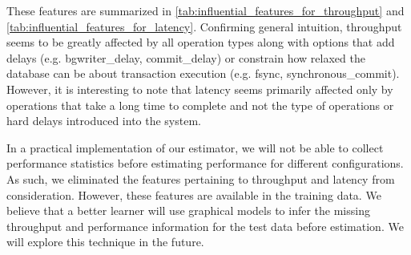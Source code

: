  These features are summarized in
\cref{tab:influential_features_for_throughput} and
\cref{tab:influential_features_for_latency}. Confirming general
intuition, throughput seems to be greatly affected by all operation
types along with options that add delays (e.g. bgwriter\_delay,
commit\_delay) or constrain how relaxed the database can be about
transaction execution (e.g. fsync, synchronous\_commit). However, it
is interesting to note that latency seems primarily affected only by
operations that take a long time to complete and not the type of
operations or hard delays introduced into the system.

In a practical implementation of our estimator, we will not be able
to collect performance statistics before estimating performance for
different configurations. As such, we eliminated the features
pertaining to throughput and latency from consideration. However,
these features are available in the training data. We believe that a
better learner will use graphical models to infer the missing
throughput and performance information for the test data before
estimation. We will explore this technique in the future.